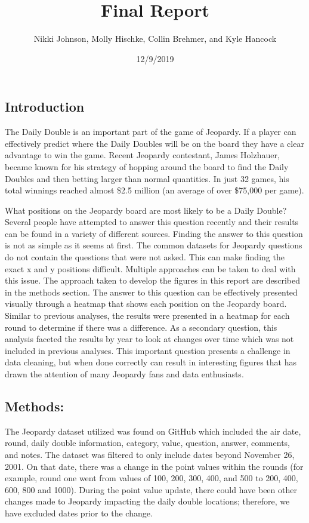 \documentclass[]{article}
\title{Final Report}
\author{Nikki Johnson, Molly Hischke, Collin Brehmer, and Kyle Hancock}
\date{12/9/2019}
\begin{document}
\maketitle

\hypertarget{introduction}{%
\subsection{Introduction}\label{introduction}}

The Daily Double is an important part of the game of Jeopardy. If a
player can effectively predict where the Daily Doubles will be on the
board they have a clear advantage to win the game. Recent Jeopardy
contestant, James Holzhauer, became known for his strategy of hopping
around the board to find the Daily Doubles and then betting larger than
normal quantities. In just 32 games, his total winnings reached almost
\$2.5 million (an average of over \$75,000 per game).

What positions on the Jeopardy board are most likely to be a Daily
Double? Several people have attempted to answer this question recently
and their results can be found in a variety of different sources.
Finding the answer to this question is not as simple as it seems at
first. The common datasets for Jeopardy questions do not contain the
questions that were not asked. This can make finding the exact x and y
positions difficult. Multiple approaches can be taken to deal with this
issue. The approach taken to develop the figures in this report are
described in the methods section. The answer to this question can be
effectively presented visually through a heatmap that shows each
position on the Jeopardy board. Similar to previous analyses, the
results were presented in a heatmap for each round to determine if there
was a difference. As a secondary question, this analysis faceted the
results by year to look at changes over time which was not included in
previous analyses. This important question presents a challenge in data
cleaning, but when done correctly can result in interesting figures that
has drawn the attention of many Jeopardy fans and data enthusiasts.

\hypertarget{methods}{%
\subsection{Methods:}\label{methods}}

The Jeopardy dataset utilized was found on GitHub which included the air
date, round, daily double information, category, value, question,
answer, comments, and notes. The dataset was filtered to only include
dates beyond November 26, 2001. On that date, there was a change in the
point values within the rounds (for example, round one went from values
of 100, 200, 300, 400, and 500 to 200, 400, 600, 800 and 1000). During
the point value update, there could have been other changes made to
Jeopardy impacting the daily double locations; therefore, we have
excluded dates prior to the change.
\end{document}
